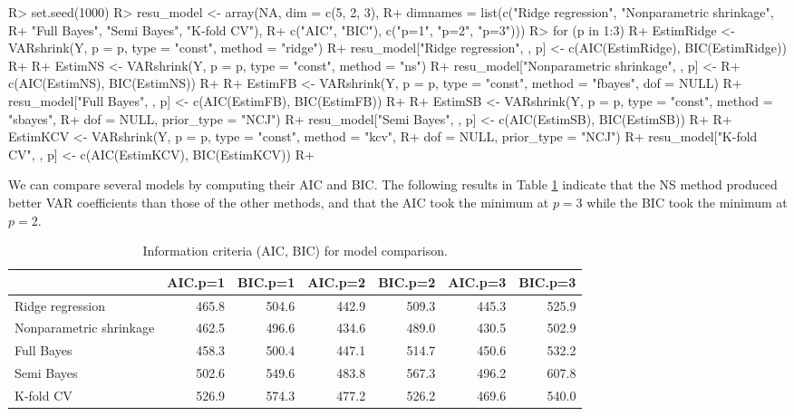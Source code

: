 \documentclass[
]{jss}
\begin{document}
\begin{CodeChunk}

\begin{CodeInput}
R> set.seed(1000)
R> resu_model <- array(NA, dim = c(5, 2, 3),
R+   dimnames = list(c("Ridge regression", "Nonparametric shrinkage",
R+                     "Full Bayes", "Semi Bayes", "K-fold CV"),
R+                   c("AIC", "BIC"), c("p=1", "p=2", "p=3")))
R> for (p in 1:3) {
R+   EstimRidge <- VARshrink(Y, p = p, type = "const", method = "ridge")
R+   resu_model["Ridge regression", , p] <- c(AIC(EstimRidge), BIC(EstimRidge))
R+ 
R+   EstimNS <- VARshrink(Y, p = p, type = "const", method = "ns")
R+   resu_model["Nonparametric shrinkage", , p] <-
R+     c(AIC(EstimNS), BIC(EstimNS))
R+ 
R+   EstimFB <- VARshrink(Y, p = p, type = "const", method = "fbayes", dof = NULL)
R+   resu_model["Full Bayes", , p] <- c(AIC(EstimFB), BIC(EstimFB))
R+ 
R+   EstimSB <- VARshrink(Y, p = p, type = "const", method = "sbayes",
R+                        dof = NULL, prior_type = "NCJ")
R+   resu_model["Semi Bayes", , p] <- c(AIC(EstimSB), BIC(EstimSB))
R+ 
R+   EstimKCV <- VARshrink(Y, p = p, type = "const", method = "kcv",
R+                           dof = NULL, prior_type = "NCJ")
R+   resu_model["K-fold CV", , p] <- c(AIC(EstimKCV), BIC(EstimKCV))
R+ }
\end{CodeInput}
\end{CodeChunk}

We can compare several models by computing their AIC and BIC. The
following results in Table \ref{tab:modelcomp} indicate that the NS
method produced better VAR coefficients than those of the other methods,
and that the AIC took the minimum at \(p=3\) while the BIC took the
minimum at \(p=2\).

\begin{CodeChunk}
\begin{table}[t]

\caption{\label{tab:modelcomp}\label{tab:modelcomp}Information criteria (AIC, BIC) for model comparison.}
\centering
\begin{tabular}{l|r|r|r|r|r|r}
\hline
  & AIC.p=1 & BIC.p=1 & AIC.p=2 & BIC.p=2 & AIC.p=3 & BIC.p=3\\
\hline
Ridge regression & 465.8 & 504.6 & 442.9 & 509.3 & 445.3 & 525.9\\
\hline
Nonparametric shrinkage & 462.5 & 496.6 & 434.6 & 489.0 & 430.5 & 502.9\\
\hline
Full Bayes & 458.3 & 500.4 & 447.1 & 514.7 & 450.6 & 532.2\\
\hline
Semi Bayes & 502.6 & 549.6 & 483.8 & 567.3 & 496.2 & 607.8\\
\hline
K-fold CV & 526.9 & 574.3 & 477.2 & 526.2 & 469.6 & 540.0\\
\hline
\end{tabular}
\end{table}

\end{CodeChunk}
\end{document}
